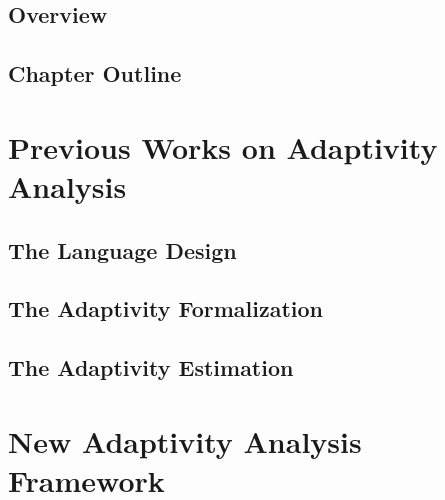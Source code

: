 \documentclass[12pt, letterpaper]{report}   %
\begin{document}
\section{Overview}
\label{sec:adapt-motivation}


\section{Chapter Outline}
\label{sec:adapt-outline}


\chapter{Previous Works on Adaptivity Analysis}
\label{sec:prework}

%
\section{The Language Design}
\label{sec:prework-language}

%
\section{The Adaptivity Formalization}
\label{sec:prework-formalization}

%
\section{The Adaptivity Estimation}
\label{sec:prework-static}





\chapter{New Adaptivity Analysis Framework}
\label{sec:adapt-analysis}


% 
\clearpage
\end{document}

